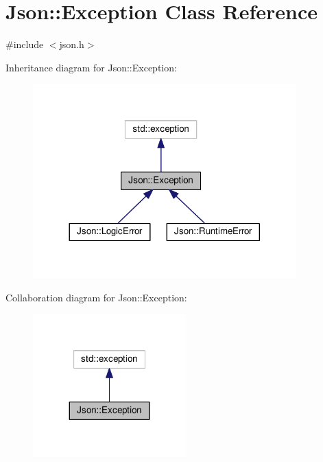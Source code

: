 \hypertarget{class_json_1_1_exception}{}\section{Json\+:\+:Exception Class Reference}
\label{class_json_1_1_exception}


{\ttfamily \#include $<$json.\+h$>$}



Inheritance diagram for Json\+:\+:Exception\+:
\nopagebreak
\begin{figure}[H]
\begin{center}
\leavevmode
\includegraphics[width=288pt]{class_json_1_1_exception__inherit__graph}
\end{center}
\end{figure}


Collaboration diagram for Json\+:\+:Exception\+:
\nopagebreak
\begin{figure}[H]
\begin{center}
\leavevmode
\includegraphics[width=167pt]{class_json_1_1_exception__coll__graph}
\end{center}
\end{figure}
